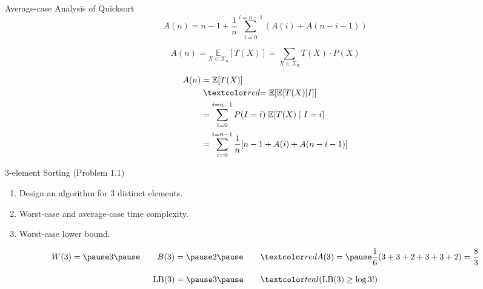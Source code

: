 \begin{frame}{Average-case Analysis of Quicksort}
  \[
    A(n) = n-1 + \frac{1}{n} \sum_{i=0}^{i=n-1} (A(i) + A(n-i-1))
  \]

  \[
    A(n) = \underset{X \in \mathcal{X}_{n}}{\mathbb{E}} [T(X)] = \sum_{X \in \mathcal{X}_{n}} T(X) \cdot P(X)
  \]

  \pause
  \begin{align*}
    A(n) &= \mathbb{E}[T(X)] \\
	 &\;\red{= \mathbb{E}[\mathbb{E}[T(X)|I]]} \\
	 &= \sum_{i=0}^{i=n-1} P(I = i)\; \mathbb{E}[T(X) \mid I = i] \\
	 &= \sum_{i=0}^{i=n-1} \frac{1}{n} [n-1 + A(i) + A(n-i-1)]
  \end{align*}
\end{frame}

\begin{frame}{}
  \begin{exampleblock}{$3$-element Sorting (Problem $1.1$)}
    \begin{enumerate}[(1)]
      \item Design an algorithm for  $3$ distinct elements.
      \item Worst-case and average-case time complexity.
      \item Worst-case lower bound.
    \end{enumerate}
  \end{exampleblock}

  \pause

  \pause
  \vspace{-0.30cm}
  \[
    W(3) =\pause 3 \pause\qquad B(3) =\pause 2 \pause\qquad \red{A(3)} = \pause \frac{1}{6} (3+3+2+3+3+2) = \frac{8}{3}
  \]

  \pause
  \vspace{-0.60cm}
  \[
    \text{LB}(3) =\pause 3 \pause \qquad \teal{(\text{LB}(3) \ge \log 3!)}
  \]
\end{frame}

